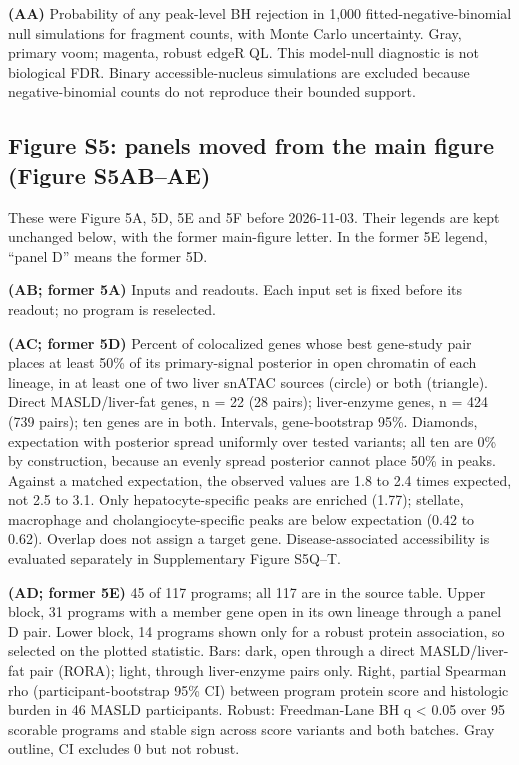 \textbf{(AA)} Probability of any peak-level BH rejection in 1,000 fitted-negative-binomial null simulations for fragment counts, with Monte Carlo uncertainty. Gray, primary voom; magenta, robust edgeR QL. This model-null diagnostic is not biological FDR. Binary accessible-nucleus simulations are excluded because negative-binomial counts do not reproduce their bounded support.


\subsection{Figure S5: panels moved from the main figure (Figure S5AB--AE)}\label{figure-s5-panels-moved-from-the-main-figure-2026-11-03-letters-to-be-assigned}

These were Figure 5A, 5D, 5E and 5F before 2026-11-03. Their legends are kept unchanged below, with the former main-figure letter. In the former 5E legend, ``panel D'' means the former 5D.

\textbf{(AB; former 5A)} Inputs and readouts. Each input set is fixed before its readout; no program is reselected.

\textbf{(AC; former 5D)} Percent of colocalized genes whose best gene-study pair places at least 50\% of its primary-signal posterior in open chromatin of each lineage, in at least one of two liver snATAC sources (circle) or both (triangle). Direct MASLD/liver-fat genes, n = 22 (28 pairs); liver-enzyme genes, n = 424 (739 pairs); ten genes are in both. Intervals, gene-bootstrap 95\%. Diamonds, expectation with posterior spread uniformly over tested variants; all ten are 0\% by construction, because an evenly spread posterior cannot place 50\% in peaks. Against a matched expectation, the observed values are 1.8 to 2.4 times expected, not 2.5 to 3.1. Only hepatocyte-specific peaks are enriched (1.77); stellate, macrophage and cholangiocyte-specific peaks are below expectation (0.42 to 0.62). Overlap does not assign a target gene. Disease-associated accessibility is evaluated separately in Supplementary Figure S5Q--T.

\textbf{(AD; former 5E)} 45 of 117 programs; all 117 are in the source table. Upper block, 31 programs with a member gene open in its own lineage through a panel D pair. Lower block, 14 programs shown only for a robust protein association, so selected on the plotted statistic. Bars: dark, open through a direct MASLD/liver-fat pair (RORA); light, through liver-enzyme pairs only. Right, partial Spearman rho (participant-bootstrap 95\% CI) between program protein score and histologic burden in 46 MASLD participants. Robust: Freedman-Lane BH q \textless{} 0.05 over 95 scorable programs and stable sign across score variants and both batches. Gray outline, CI excludes 0 but not robust.

